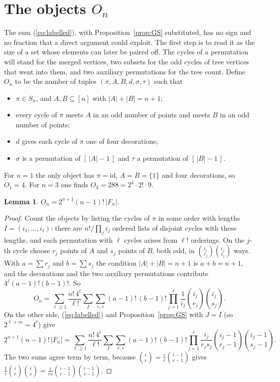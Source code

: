 \documentclass[11pt]{amsart}
\newtheorem{lemma}[theorem]{Lemma}
\theoremstyle{remark}
\begin{document}
\section{The objects $O_n$}\label{sec:bridge}

The sum (\ref{eq:labelled}), with Proposition~\ref{prop:GS} substituted, has no sign and no fraction that a direct
argument could exploit. The first step is to read it as the size of a set whose elements can later be paired off. The
cycles of a permutation will stand for the merged vertices, two subsets for the odd cycles of tree vertices that went
into them, and two auxiliary permutations for the tree count. Define $O_n$ to be the number of tuples $(\pi,A,B,d,\sigma,\tau)$ such that
\begin{itemize}
\item $\pi\in S_n$, and $A,B\subseteq[n]$ with $|A|+|B|=n+1$;
\item every cycle of $\pi$ meets $A$ in an odd number of points and meets $B$ in an odd number of points;
\item $d$ gives each cycle of $\pi$ one of four decorations;
\item $\sigma$ is a permutation of $[\,|A|-1\,]$ and $\tau$ a permutation of $[\,|B|-1\,]$.
\end{itemize}
For $n=1$ the only object has $\pi=\mathrm{id}$, $A=B=\{1\}$ and four decorations, so $O_1=4$. For $n=3$ one finds
$O_3=288=2^4\cdot2!\cdot9$.

\begin{lemma}\label{lem:bridge}
$O_n=2^{n+1}(n-1)!\,|F_n|$.
\end{lemma}

\begin{proof}
Count the objects by listing the cycles of $\pi$ in some order with lengths $I=(i_1,\dots,i_\ell)$: there are
$n!/\prod_j i_j$ ordered lists of disjoint cycles with these lengths, and each permutation with $\ell$ cycles arises
from $\ell!$ orderings. On the $j$-th cycle choose $r_j$ points of $A$ and $s_j$ points of $B$, both odd, in
$\binom{i_j}{r_j}\binom{i_j}{s_j}$ ways. With $a=\sum r_j$ and $b=\sum s_j$ the condition $|A|+|B|=n+1$ is $a+b=n+1$,
and the decorations and the two auxiliary permutations contribute $4^\ell(a-1)!(b-1)!$. So
\[
  O_n=\sum_{\ell\ge1}\frac{n!\,4^\ell}{\ell!}\sum_I\sum_{r,s}(a-1)!\,(b-1)!\prod_{j=1}^{\ell}
      \frac{1}{i_j}\binom{i_j}{r_j}\binom{i_j}{s_j}.
\]
On the other side, (\ref{eq:labelled}) and Proposition~\ref{prop:GS} with $J=I$ (so $2^{\ell+m}=4^\ell$) give
\[
  2^{n+1}(n-1)!\,|F_n|=\sum_{\ell\ge1}\frac{n!\,4^\ell}{\ell!}\sum_I\sum_{r,s}(a-1)!\,(b-1)!\prod_{j=1}^{\ell}
      \frac{i_j}{r_js_j}\binom{i_j-1}{r_j-1}\binom{i_j-1}{s_j-1}.
\]
The two sums agree term by term, because $\binom{i}{r}=\frac{i}{r}\binom{i-1}{r-1}$ gives
$\frac1i\binom ir\binom is=\frac{i}{rs}\binom{i-1}{r-1}\binom{i-1}{s-1}$.
\end{proof}
\end{document}

